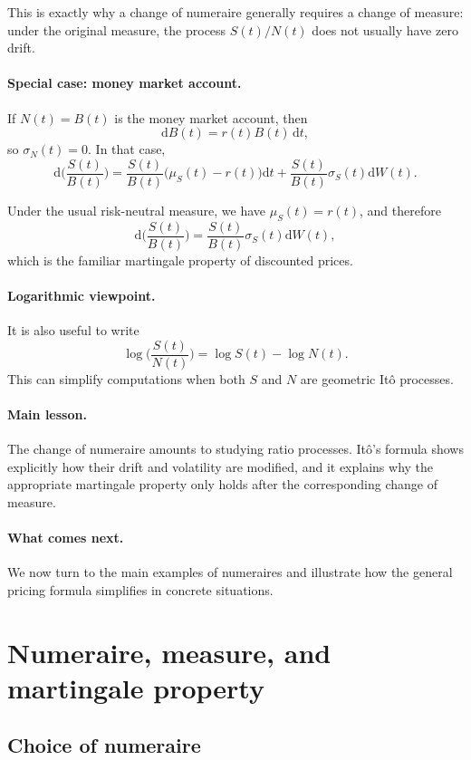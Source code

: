 \documentclass[11pt]{article}
\theoremstyle{definition}
\theoremstyle{plain}
\begin{document}
This is exactly why a change of numeraire generally requires a change of
measure: under the original measure, the process \(S(t)/N(t)\) does not
usually have zero drift.

\paragraph{Special case: money market account.}
If \(N(t)=B(t)\) is the money market account, then
\[
\mathrm{d}B(t)=r(t)B(t)\,\mathrm{d}t,
\]
so \(\sigma_N(t)=0\).
In that case,
\[
\mathrm{d}\Big(\frac{S(t)}{B(t)}\Big)
=
\frac{S(t)}{B(t)}\big(\mu_S(t)-r(t)\big)\mathrm{d}t
+
\frac{S(t)}{B(t)}\sigma_S(t)\mathrm{d}W(t).
\]

Under the usual risk-neutral measure, we have \(\mu_S(t)=r(t)\), and
therefore
\[
\mathrm{d}\Big(\frac{S(t)}{B(t)}\Big)
=
\frac{S(t)}{B(t)}\sigma_S(t)\mathrm{d}W(t),
\]
which is the familiar martingale property of discounted prices.

\paragraph{Logarithmic viewpoint.}
It is also useful to write
\[
\log\Big(\frac{S(t)}{N(t)}\Big)=\log S(t)-\log N(t).
\]
This can simplify computations when both \(S\) and \(N\) are geometric
It\^o processes.

\paragraph{Main lesson.}
The change of numeraire amounts to studying ratio processes.
It\^o's formula shows explicitly how their drift and volatility are
modified, and it explains why the appropriate martingale property only
holds after the corresponding change of measure.

\paragraph{What comes next.}
We now turn to the main examples of numeraires and illustrate how the
general pricing formula simplifies in concrete situations.


\section{Numeraire, measure, and martingale property}

\subsection{Choice of numeraire}
\end{document}
